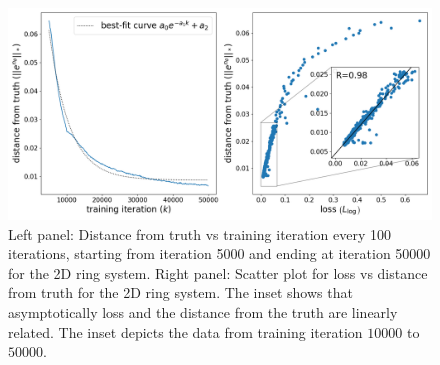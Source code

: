 \begin{figure}[!ht]
    \centering\includegraphics[scale=0.4]{steady-fp/plots/2D-distance.png}
    \caption{Left panel: Distance from truth vs training iteration every 100 iterations, starting from iteration 5000 and ending at iteration 50000 for the 2D ring system. Right panel: Scatter plot for loss vs distance from truth for the 2D ring system. The inset shows that asymptotically loss and the distance from the truth are linearly related. The inset depicts the data from training iteration $10000$ to $50000$.}
    \label{fig:dist-loss--steady-fp}
\end{figure}